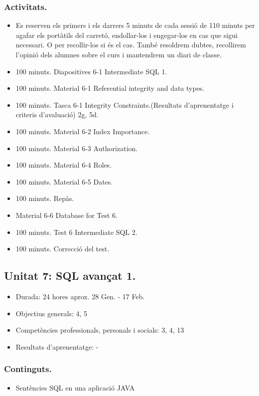 \documentclass[catalan, a4paper, 12pt, titlepage]{article}
\begin{document}
  \subsubsection{Activitats.}
  \begin{itemize}
          \item Es reserven els primers i els darrers 5 minuts de cada sessió de 110 minuts per agafar els portàtils del carretó, endollar-los i engegar-los en cas que sigui necessari. O per recollir-los si és el cas. També resoldrem dubtes, recollirem l'opinió dels alumnes sobre el curs i mantendrem un diari de classe.
	  \item 100 minuts. Diapositives 6-1 Intermediate SQL 1.
	  \item 100 minuts. Material 6-1 Referential integrity and data types.
	  \item 100 minuts. Tasca 6-1 Integrity Constraints.(\faGraduationCap Resultats d'aprenentatge i criteris d'avaluació) 2g, 5d. 
	  \item 100 minuts. Material 6-2 Index Importance.
	  \item 100 minuts. Material 6-3 Authorization.
	  \item 100 minuts. Material 6-4 Roles.
	  \item 100 minuts. Material 6-5 Dates.
	  \item 100 minuts. Repàs.
	  \item Material 6-6 Database for Test 6.
	  \item 100 minuts. Test 6 Intermediate SQL 2.
	  \item 100 minuts. Correcció del test.
  \end{itemize}
  

  \subsection{Unitat 7: SQL avançat 1.}

  \begin{itemize}
	\item Durada: 24 hores aprox. 28 Gen. - 17 Feb.
	\item Objectius generals: 4, 5
	\item Competències professionals, personals i socials: 3, 4, 13
	\item Resultats d'aprenentatge: -
  \end{itemize}
  
  \subsubsection{Continguts.}
  \begin{itemize}
	  \item Sentències SQL en una aplicació JAVA
  \end{itemize}
\end{document}
